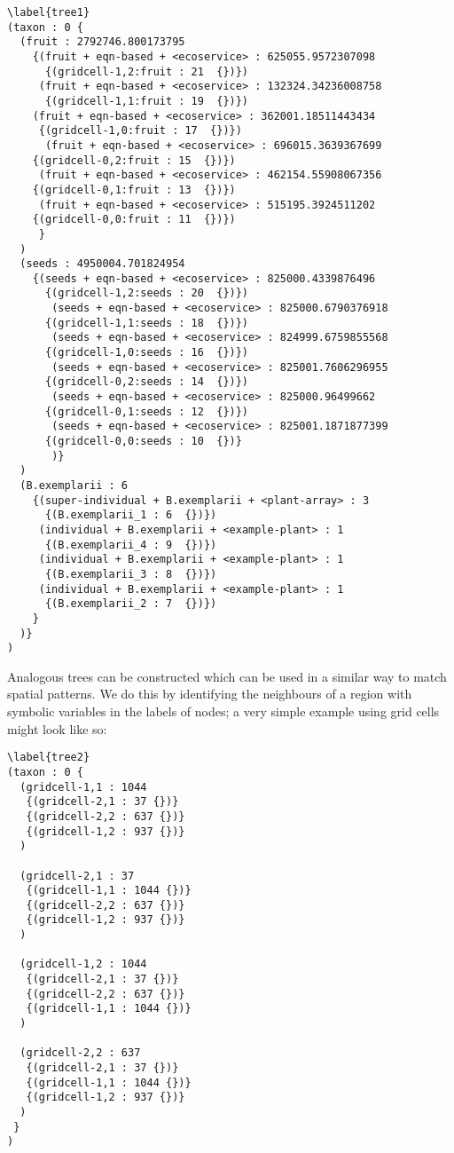 \begin{verbatim}\label{tree1}
(taxon : 0 {
  (fruit : 2792746.800173795 
    {(fruit + eqn-based + <ecoservice> : 625055.9572307098 
      {(gridcell-1,2:fruit : 21  {})})
     (fruit + eqn-based + <ecoservice> : 132324.34236008758 
      {(gridcell-1,1:fruit : 19  {})})
    (fruit + eqn-based + <ecoservice> : 362001.18511443434 
     {(gridcell-1,0:fruit : 17  {})})
      (fruit + eqn-based + <ecoservice> : 696015.3639367699 
    {(gridcell-0,2:fruit : 15  {})})
     (fruit + eqn-based + <ecoservice> : 462154.55908067356 
    {(gridcell-0,1:fruit : 13  {})})
     (fruit + eqn-based + <ecoservice> : 515195.3924511202 
    {(gridcell-0,0:fruit : 11  {})})
     }
  )
  (seeds : 4950004.701824954 
    {(seeds + eqn-based + <ecoservice> : 825000.4339876496 
      {(gridcell-1,2:seeds : 20  {})})
       (seeds + eqn-based + <ecoservice> : 825000.6790376918 
      {(gridcell-1,1:seeds : 18  {})})
       (seeds + eqn-based + <ecoservice> : 824999.6759855568 
      {(gridcell-1,0:seeds : 16  {})})
       (seeds + eqn-based + <ecoservice> : 825001.7606296955 
      {(gridcell-0,2:seeds : 14  {})})
       (seeds + eqn-based + <ecoservice> : 825000.96499662 
      {(gridcell-0,1:seeds : 12  {})})
       (seeds + eqn-based + <ecoservice> : 825001.1871877399 
      {(gridcell-0,0:seeds : 10  {})}
       )}
  )
  (B.exemplarii : 6 
    {(super-individual + B.exemplarii + <plant-array> : 3 
      {(B.exemplarii_1 : 6  {})})
     (individual + B.exemplarii + <example-plant> : 1 
      {(B.exemplarii_4 : 9  {})})
     (individual + B.exemplarii + <example-plant> : 1 
      {(B.exemplarii_3 : 8  {})})
     (individual + B.exemplarii + <example-plant> : 1 
      {(B.exemplarii_2 : 7  {})})
    }
  )}
)
\end{verbatim}

Analogous trees can be constructed which can be used in a similar way
to match spatial patterns. We do this by identifying the neighbours of
a region with symbolic variables in the labels of nodes; a very simple
example using grid cells might look like so:

\begin{verbatim}\label{tree2}
(taxon : 0 {
  (gridcell-1,1 : 1044
   {(gridcell-2,1 : 37 {})}
   {(gridcell-2,2 : 637 {})}
   {(gridcell-1,2 : 937 {})}
  )

  (gridcell-2,1 : 37
   {(gridcell-1,1 : 1044 {})}
   {(gridcell-2,2 : 637 {})}
   {(gridcell-1,2 : 937 {})}
  )

  (gridcell-1,2 : 1044
   {(gridcell-2,1 : 37 {})}
   {(gridcell-2,2 : 637 {})}
   {(gridcell-1,1 : 1044 {})}
  )

  (gridcell-2,2 : 637
   {(gridcell-2,1 : 37 {})}
   {(gridcell-1,1 : 1044 {})}
   {(gridcell-1,2 : 937 {})}
  )
 }
)
\end{verbatim}

